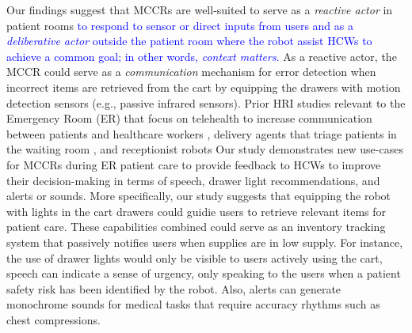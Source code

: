 Our findings suggest that MCCRs are well-suited to serve as a \textit{reactive actor} in patient rooms \textcolor{blue}{to respond to sensor or direct inputs from users and as a \textit{deliberative actor} outside the patient room where the robot assist HCWs to achieve a common goal; in other words, \textit{context matters}.} %
As a reactive actor, the MCCR could serve as a \textit{communication} mechanism for error detection when incorrect items are retrieved from the cart by equipping the drawers with motion detection sensors (e.g., passive infrared sensors). %
Prior HRI studies relevant to the Emergency Room (ER) that focus on telehealth to increase communication between patients and healthcare workers \cite{matsumoto2023robot}, delivery agents that triage patients in the waiting room \cite{wilkes2010heterogeneous}, and receptionist robots \cite{ahn2015healthcare}
Our study demonstrates new use-cases for MCCRs during ER patient care to provide feedback to HCWs to improve their decision-making in terms of speech, drawer light recommendations, and alerts or sounds. 
More specifically, our study suggests that equipping the robot with lights in the cart drawers could guidie users to retrieve relevant items for patient care. 
These capabilities combined could serve as an inventory tracking system that passively notifies users when supplies are in low supply. 
For instance, the use of drawer lights would only be visible to users actively using the cart, speech can indicate a sense of urgency, only speaking to the users when a patient safety risk has been identified by the robot. 
Also, alerts can generate monochrome sounds for medical tasks that require accuracy rhythms such as chest compressions.

